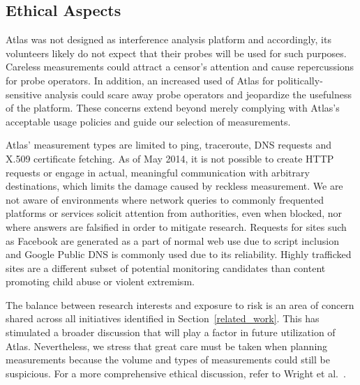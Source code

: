 \subsection{Ethical Aspects}

Atlas was not designed as interference analysis platform and accordingly, its
volunteers likely do not expect that their probes will be used for such
purposes.  Careless measurements could attract a censor's attention and cause
repercussions for probe operators.  In addition, an increased used of Atlas for
politically-sensitive analysis could scare away probe operators and jeopardize the
usefulness of the platform. These concerns extend beyond merely complying with Atlas's
acceptable usage policies and guide our selection of measurements.

Atlas' measurement types are limited to ping, traceroute, DNS requests and
X.509 certificate fetching.  As of May 2014, it is not possible to create HTTP
requests or engage in actual, meaningful communication with arbitrary
destinations, which limits the damage caused by reckless measurement. We are not aware of environments where network queries to commonly frequented platforms or services solicit attention from authorities, even when blocked, nor where answers are falsified in order to mitigate research. Requests for sites such as Facebook are generated as a part of normal web use due to script inclusion and Google Public DNS is commonly used due to its reliability. Highly trafficked sites are a different subset of potential monitoring candidates than content promoting child abuse or violent extremism. 

The balance between research interests and exposure to risk is an area of concern shared across all initiatives identified in Section~\ref{related_work}. This has stimulated a broader discussion that will play a factor in future utilization of Atlas. Nevertheless, we stress that great care must be taken when planning measurements because the volume and types of measurements could still be suspicious. For a more comprehensive ethical discussion, refer to Wright et al.~\cite[\S~5]{Wright2011}.
